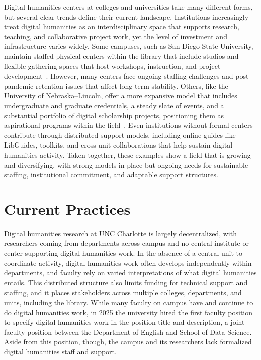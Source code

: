 \documentclass[final]{anthology-ch}
\begin{document}
Digital humanities centers at colleges and universities take many different forms, but several clear trends define their current landscape. Institutions increasingly treat digital humanities as an interdisciplinary space that supports research, teaching, and collaborative project work, yet the level of investment and infrastructure varies widely. Some campuses, such as San Diego State University, maintain staffed physical centers within the library that include studios and flexible gathering spaces that host workshops, instruction, and project development~\cite{lach2024interview}. However, many centers face ongoing staffing challenges and post-pandemic retention issues that affect long-term stability. Others, like the University of Nebraska--Lincoln, offer a more expansive model that includes undergraduate and graduate credentials, a steady slate of events, and a substantial portfolio of digital scholarship projects, positioning them as aspirational programs within the field~\cite{cdrh2026anniversary}. Even institutions without formal centers contribute through distributed support models, including online guides like LibGuides, toolkits, and cross-unit collaborations that help sustain digital humanities activity. Taken together, these examples show a field that is growing and diversifying, with strong models in place but ongoing needs for sustainable staffing, institutional commitment, and adaptable support structures.

\section{Current Practices} \label{sec:current}

Digital humanities research at UNC Charlotte is largely decentralized, with researchers coming from departments across campus and no central institute or center supporting digital humanities work. In the absence of a central unit to coordinate activity, digital humanities work often develops independently within departments, and faculty rely on varied interpretations of what digital humanities entails. This distributed structure also limits funding for technical support and staffing, and it places stakeholders across multiple colleges, departments, and units, including the library. While many faculty on campus have and continue to do digital humanities work, in 2025 the university hired the first faculty position to specify digital humanities work in the position title and description, a joint faculty position between the Department of English and School of Data Science. Aside from this position, though, the campus and its researchers lack formalized digital humanities staff and support.
\end{document}

